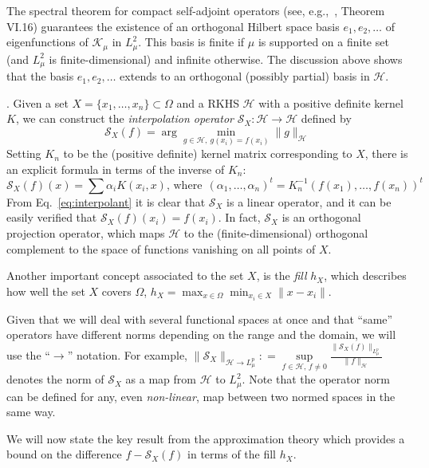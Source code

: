 \documentclass[final,12pt]{colt2018}
\renewcommand{\H}{\mathcal{H}}
\newcommand{\K}{\mathcal{K_\mu}}
\newcommand{\LL}{{L^2_\mu}}
\newcommand{\LpL}{{L^p_\mu}}
\renewcommand{\S}{{\mathcal S}}
\begin{document}
The spectral theorem for compact self-adjoint operators (see, e.g.,~\cite{reed1980functional}, Theorem VI.16) guarantees the existence of an orthogonal Hilbert space basis $e_1, e_2, \dots$ of eigenfunctions of $\K$ in $\LL$. 
This basis is finite if $\mu$ is supported on a finite set (and $\LL$ is finite-dimensional) and infinite otherwise.
The discussion above shows that the basis  $e_1, e_2, \dots$ extends to an orthogonal (possibly partial) basis in $\H$.  


.  Given a set  $X = \{x_1,\ldots,x_n\} \subset \Omega$ and a RKHS $\H$ with a positive definite kernel $K$, we can construct the {\it interpolation operator} $\S_X:\H \to \H$ defined by
$$
\S_X(f) = \arg \min_{g\in \H, ~g(x_i)= f(x_i)} \|g\|_\H 
$$
Setting $K_n$ to be the (positive definite) kernel matrix corresponding to $X$, there is an explicit formula in terms of the inverse of  $K_n$:
\begin{equation}\label{eq:interpolant}
\S_X(f)(x) = \sum \alpha_i K(x_i,x),\,\mathrm{where} ~~ (\alpha_1,\ldots,\alpha_n)^t = K_n^{-1} (f(x_1),\ldots, f(x_n))^t
\end{equation}
From Eq.~\ref{eq:interpolant} it is clear that $\S_X$ is a linear operator, and it can be easily verified that $\S_X(f)(x_i)=f(x_i)$.
In fact, $\S_X$ is an orthogonal  projection operator, which  maps $\H$ to the (finite-dimensional) orthogonal complement to the space of functions vanishing on all points of $X$. 

Another important concept associated to the set $X$, is the {\it fill} $h_X$, which describes how well the set $X$ covers $\Omega$, 
$h_X = \max_{x\in \Omega} \min_{x_i \in X} \|x - x_i\| $.  

Given that we will deal with several functional spaces at once and that ``same'' operators have different norms  depending on the range and the domain, we will use the ``$\to$'' notation. For example, $\| \S_X\|_{\H \to \LpL}: = \sup\limits_{f \in \H,\, f \ne 0} \frac{\|\S_X(f)\|_\LpL}{\|f\|_\H}$ denotes the norm of $\S_X$ as a map from $\H$ to $\LL$. Note that the operator  norm can be defined for any, even {\it non-linear}, map between two normed spaces in the same way. 
 


We will now state the  key result from the approximation theory which provides a bound on the difference $f - \S_X(f)$ in terms of the fill $h_X$. 
\end{document}
